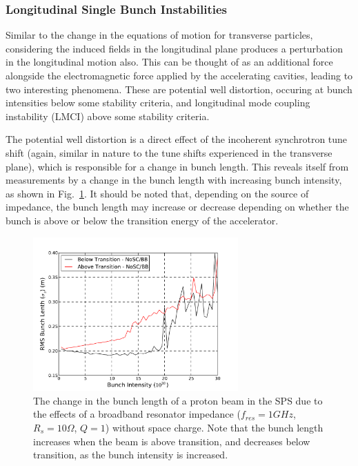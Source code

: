 \subsubsection{Longitudinal Single Bunch Instabilities}

Similar to the change in the equations of motion for transverse particles, considering the induced fields in the longitudinal plane produces a perturbation in the longitudinal motion also. This can be thought of as an additional force alongside the electromagnetic force applied by the accelerating cavities, leading to two interesting phenomena. These are potential well distortion, occuring at bunch intensities below some stability criteria, and longitudinal mode coupling instability (LMCI) above some stability criteria.

The potential well distortion is a direct effect of the incoherent synchrotron tune shift (again, similar in nature to the tune shifts experienced in the transverse plane), which is responsible for a change in bunch length. This reveals itself from measurements by a change in the bunch length with increasing bunch intensity, as shown in Fig.~\ref{fig:pot_well_dist}. It should be noted that, depending on the source of impedance, the bunch length may increase or decrease depending on whether the bunch is above or below the transition energy of the accelerator.

\begin{figure}
\begin{center}
\includegraphics[width=0.7\textwidth]{Wakefields_and_Impedances/figures/rms_bunch_length_AT_BT_BB.pdf}
\end{center}
\caption{The change in the bunch length of a proton beam in the SPS due to the effects of a broadband resonator impedance ($f_{res} = 1GHz$, $R_{s}=10 \Omega$, $Q=1$) without space charge. Note that the bunch length increases when the beam is above transition, and decreases below transition, as the bunch intensity is increased.}
\label{fig:pot_well_dist}
\end{figure}

